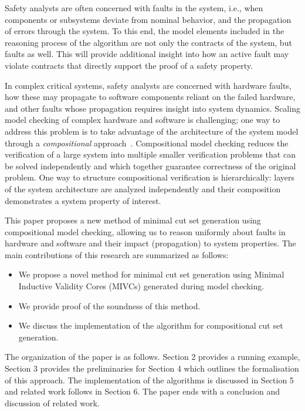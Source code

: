 
Safety analysts are often concerned with faults in the system, i.e., when components or subsystems deviate from nominal behavior, and the propagation of errors through the system. To this end, the model elements included in the reasoning process of the \aivcalg algorithm are not only the contracts of the system, but faults as well. This will provide additional insight into how an active fault may violate contracts that directly support the proof of a safety property. 

In complex critical systems, safety analysts are concerned with hardware faults, how these may propagate to software components reliant on the failed hardware, and other faults whose propagation requires insight into system dynamics. Scaling model checking of complex hardware and software is challenging;  one way to address this problem is to take advantage of the architecture of the system model through a \textit{compositional} approach~\cite{anderson1996model, clarke1989compositional,mcmillan1999verification}. Compositional model checking reduces the verification of a large system into multiple smaller verification problems that can be solved independently and which together guarantee correctness of the original problem.  One way to structure compositional verification is hierarchically: layers of the system architecture are analyzed independently and their composition demonstrates a system property of interest.

This paper proposes a new method of minimal cut set generation using compositional model checking, allowing us to reason uniformly about faults in hardware and software and their impact (propagation) to system properties. The main contributions of this research are summarized as follows: 
\begin{itemize}
\item We propose a novel method for minimal cut set generation using Minimal Inductive Validity Cores (MIVCs) generated during model checking. 
\item We provide proof of the soundness of this method. 
\item We discuss the implementation of the algorithm for compositional cut set generation.
\end{itemize}

The organization of the paper is as follows.  Section 2 provides a running example, Section 3 provides the preliminaries for Section 4 which outlines the formalisation of this approach. The implementation of the algorithms is discussed in Section 5 and related work follows in Section 6. The paper ends with a conclusion and discussion of related work.
